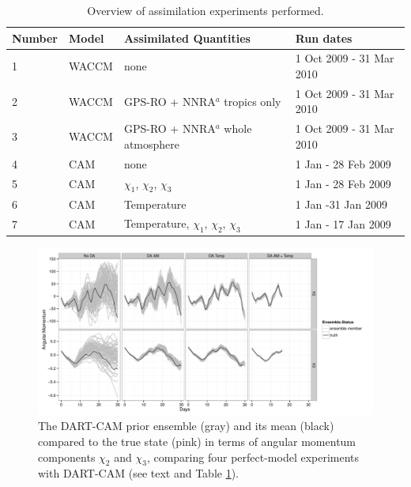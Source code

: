 \begin{table}
\caption{Overview of assimilation experiments performed.}
\centering
\begin{tabular}{p{2cm}p{2cm}p{6cm}p{4cm}}
	Number & Model &  Assimilated Quantities  & Run dates \\
\hline
1 & WACCM &	none   & 1 Oct 2009 - 31 Mar 2010	\\
2 & WACCM &	GPS-RO + NNRA$^a$ tropics only & 1 Oct 2009 - 31 Mar 2010	\\
3 & WACCM &	GPS-RO + NNRA$^a$ whole atmosphere  & 1 Oct 2009 - 31 Mar 2010	\\
4 & CAM	&	none &  1 Jan - 28 Feb 2009 \\
5 & CAM &	$\chi_1$, $\chi_2$, $\chi_3$ & 1 Jan - 28 Feb 2009 \\
6 & CAM &	Temperature	& 1 Jan -31 Jan 2009	\\
7 & CAM &	Temperature, $\chi_1$, $\chi_2$, $\chi_3$ & 1 Jan - 17 Jan 2009\\
\hline
\end{tabular}
\label{tab:expts}
\end{table}
\clearpage


\begin{figure}[p]
\includegraphics[width=\textwidth]{Paper_figures/ERPDA_paper_erpda_obs_space.pdf} 
\caption{ The DART-CAM prior ensemble (gray) and its mean (black) compared to the true state (pink) in terms of angular momentum components $\chi_2$ and $\chi_3$, comparing four perfect-model experiments with DART-CAM (see text and Table \ref{tab:expts}).  }
 \label{fig:fit_to_ERPs}
\end{figure}


